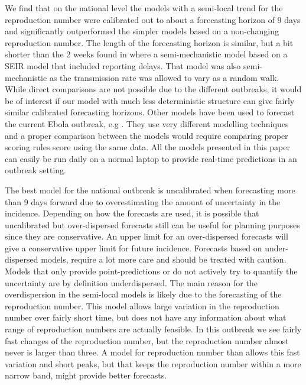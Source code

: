 \documentclass[12pt]{article}
\begin{document}
We find that on the national level the models with a semi-local trend for the reproduction number were calibrated out to about a forecasting horizon of 9 days and significantly outperformed the simpler models based on a non-changing reproduction number. The length of the forecasting horizon is similar, but a bit shorter than the 2 weeks found in \cite{funkAssessingPerformanceRealtime2019} where a semi-mechanistic model based on a SEIR model that included reporting delays. That model was also semi-mechanistic as the transmission rate was allowed to vary as a random walk. While direct comparisons are not possible due to the different outbreaks, it would be of interest if our model with much less deterministic structure can give fairly similar calibrated forecasting horizons. Other models have been used to forecast the current Ebola outbreak, e.g \cite{kellyRealtimePredictions201820192019, akhmetzhanovAnalyzingForecastingEbola2019}. They use very different modelling techniques and a proper comparison between the models would require comparing proper scoring rules score using the same data. All the models presented in this paper can easily be run daily on a normal laptop to provide real-time predictions in an outbreak setting. 


The best model for the national outbreak is uncalibrated when forecasting more than 9 days forward due to overestimating the amount of uncertainty in the incidence. Depending on how the forecasts are used, it is possible that uncalibrated but over-dispersed forecasts still can be useful for planning purposes since they are conservative. An upper limit for an over-dispersed forecasts will give a conservative upper limit for future incidence. Forecasts based on under-dispersed models, require a lot more care and should be treated with caution. Models that only provide point-predictions or do not actively try to quantify the uncertainty are by definition underdispersed. The main reason for the overdispersion in the semi-local models is likely due to the forecasting of the reproduction number. This model allows large variation in the reproduction number over fairly short time, but does not have any information about what range of reproduction numbers are actually feasible. In this outbreak we see fairly fast changes of the reproduction number, but the reproduction number almost never is larger than three. A model for reproduction number than allows this fast variation and short peaks, but that keeps the reproduction number within a more narrow band, might provide better forecasts.
\end{document}
